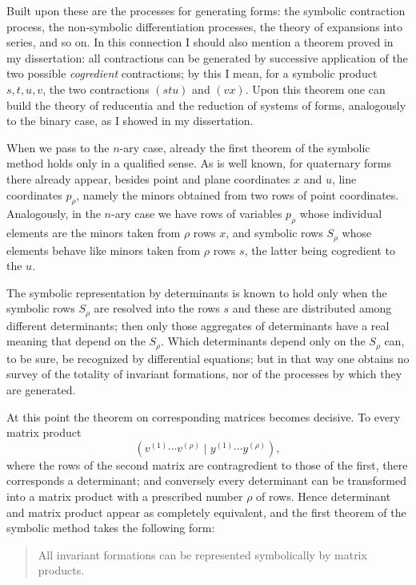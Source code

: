 \documentclass[11pt]{article}
\begin{document}
Built upon these are the processes for generating forms: the symbolic contraction process, the non-symbolic differentiation processes, the theory of expansions into series, and so on. In this connection I should also mention a theorem proved in my dissertation: all contractions can be generated by successive application of the two possible \emph{cogredient} contractions; by this I mean, for a symbolic product $s,t,u,v$, the two contractions $(stu)$ and $(vx)$. Upon this theorem one can build the theory of reducentia and the reduction of systems of forms, analogously to the binary case, as I showed in my dissertation.

When we pass to the $n$-ary case, already the first theorem of the symbolic method holds only in a qualified sense. As is well known, for quaternary forms there already appear, besides point and plane coordinates $x$ and $u$, line coordinates $p_\rho$, namely the minors obtained from two rows of point coordinates. Analogously, in the $n$-ary case we have rows of variables $p_\rho$ whose individual elements are the minors taken from $\rho$ rows $x$, and symbolic rows $S_\rho$ whose elements behave like minors taken from $\rho$ rows $s$, the latter being cogredient to the $u$.

The symbolic representation by determinants is known to hold only when the symbolic rows $S_\rho$ are resolved into the rows $s$ and these are distributed among different determinants; then only those aggregates of determinants have a real meaning that depend on the $S_\rho$. Which determinants depend only on the $S_\rho$ can, to be sure, be recognized by differential equations; but in that way one obtains no survey of the totality of invariant formations, nor of the processes by which they are generated.

At this point the theorem on corresponding matrices becomes decisive. To every matrix product
\[
(v^{(1)}\cdots v^{(\rho)} \mid y^{(1)}\cdots y^{(\rho)}),
\]
where the rows of the second matrix are contragredient to those of the first, there corresponds a determinant; and conversely every determinant can be transformed into a matrix product with a prescribed number $\rho$ of rows. Hence determinant and matrix product appear as completely equivalent, and the first theorem of the symbolic method takes the following form:

\begin{quote}
All invariant formations can be represented symbolically by matrix products.
\end{quote}
\end{document}
